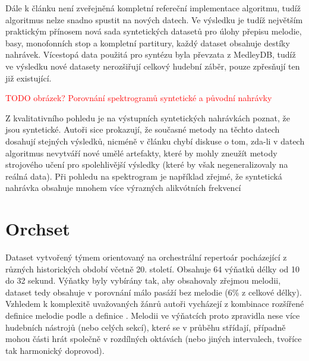 Dále k článku není zveřejněná kompletní refereční implementace algoritmu, tudíž algoritmus nelze snadno spustit na nových datech. Ve výsledku je tudíž největším praktickým přínosem nová sada syntetických datasetů pro úlohy přepisu melodie, basy, monofonních stop a kompletní partitury, každý dataset obsahuje destíky nahrávek. Vícestopá data použitá pro syntézu byla převzata z MedleyDB, tudíž ve výsledku nové datasety nerozšiřují celkový hudební záběr, pouze zpřesňují ten již existující.

\textcolor{red}{TODO obrázek? Porovnání spektrogramů syntetické a původní nahrávky}

Z kvalitativního pohledu je na výstupních syntetických nahrávkách poznat, že jsou syntetické. Autoři sice prokazují, že současné metody na těchto datech dosahují stejných výsledků, nicméně v článku chybí diskuse o tom, zda-li v datech algoritmus nevytváří nové umělé artefakty, které by mohly zneužít metody strojového učení pro spolehlivější výsledky (které by však negeneralizovaly na reálná data). Při pohledu na spektrogram je například zřejmé, že syntetická nahrávka obsahuje mnohem více výrazných alikvótních frekvencí


\section{Orchset}

Dataset vytvořený týmem \cite{Bosch2016} orientovaný na orchestrální repertoár pocházející z různých historických období včetně 20. století. Obsahuje 64 výňatků délky od 10 do 32 sekund. Výňatky byly vybírány tak, aby obsahovaly zřejmou melodii, dataset tedy obsahuje v porovnání málo pasáží bez melodie (6\% z celkové délky). Vzhledem k komplexitě uvažovaných žánrů autoři vycházejí z kombinace rozšířené definice melodie podle \cite{Bittner2014} a definice \cite{Poliner2007}. Melodii ve výňatcích proto zpravidla nese více hudebních nástrojů (nebo celých sekcí), které se v průběhu střídají, případně mohou části hrát společně v rozdílných oktávách (nebo jiných intervalech, tvoříce tak harmonický doprovod). 

